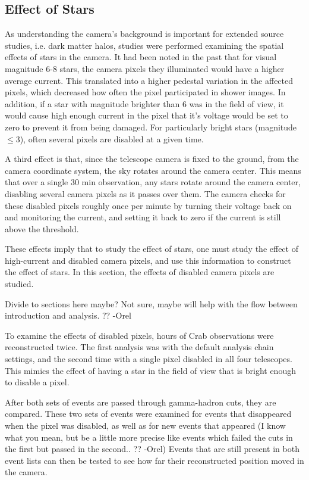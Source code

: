   \subsection{Effect of Stars}
    As understanding the camera's background is important for extended source studies, i.e. dark matter halos, studies were performed examining the spatial effects of stars in the camera.
    It had been noted in the past that for visual magnitude \nicetilde{}6-8 stars, the camera pixels they illuminated would have a higher average current.
    This translated into a higher pedestal variation in the affected pixels, which decreased how often the pixel participated in shower images.
    In addition, if a star with magnitude brighter than 6 was in the field of view, it would cause high enough current in the pixel that it's voltage would be set to zero to prevent it from being damaged.
    For particularly bright stars (magnitude $\leq{}3$), often several pixels are disabled at a given time.

    A third effect is that, since the telescope camera is fixed to the ground, from the camera coordinate system, the sky rotates around the camera center.
    This means that over a single 30 min observation, any stars rotate around the camera center, disabling several camera pixels as it passes over them.
    The camera checks for these disabled pixels roughly once per minute by turning their voltage back on and monitoring the current, and setting it back to zero if the current is still above the threshold.

    These effects imply that to study the effect of stars, one must study the effect of high-current and disabled camera pixels, and use this information to construct the effect of stars.
    In this section, the effects of disabled camera pixels are studied.
    
    {\color{red}Divide to sections here maybe? Not sure, maybe will help with the flow between introduction and analysis. ?? -Orel}

    To examine the effects of disabled pixels,  hours of Crab observations were reconstructed twice.
    The first analysis was with the default analysis chain settings, and the second time with a single pixel disabled in all four telescopes.
    This mimics the effect of having a star in the field of view that is bright enough to disable a pixel.

    After both sets of events are passed through gamma-hadron cuts, they are compared.
    These two sets of events were examined for events that disappeared when the pixel was disabled, as well as for {\color{red}new events that appeared (I know what you mean, but be a little more precise like events which failed the cuts in the first but passed in the second.. ?? -Orel)}
    Events that are still present in both event lists can then be tested to see how far their reconstructed position moved in the camera.

